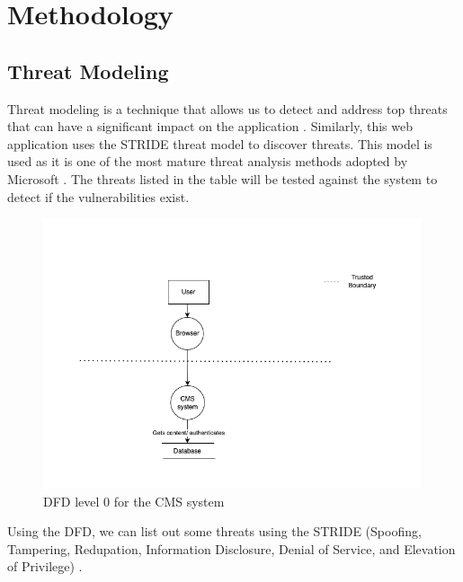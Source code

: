 \chapter{Methodology}
\section{Threat Modeling}
Threat modeling is a technique that allows us to detect and address top threats that can have a significant impact on the application \citep{threat_modeling}. Similarly, this web application uses the STRIDE threat model to discover threats. This model is used as it is one of the most mature threat analysis methods adopted by Microsoft \citep[p.~1]{shevchenko2018threat}. The threats listed in the table will be tested against the system to detect if the vulnerabilities exist.

\begin{figure}[h!]
\centering
\includegraphics[width=420px]{pics/dfd.png}
\caption{DFD level 0 for the CMS system}\label{fig:dfd}
\end{figure}

Using the DFD, we can list out some threats using the STRIDE (Spoofing, Tampering, Redupation, Information Disclosure, Denial of Service, and Elevation of Privilege) \citep[p.~2]{stride}.


